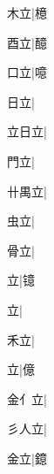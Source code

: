 \begin{multicols}{2}
{{\cjk{}{\cnsym{}　}木立}|{\cjk{}檍}\par
{\cjk{}{\cnsym{}　}酉立}|{\cjk{}醷}\par
{\cjk{}{\cnsym{}　}口立}|{\cjk{}噫}\par
{\cjk{}{\cnsym{}　}日立}|{}\par
{\cjk{}立日立}|{}\par
{\cjk{}{\cnsym{}　}門立}|{}\par
{\cjk{}卄禺立}|{}\par
{\cjk{}{\cnsym{}　}虫立}|{}\par
{\cjk{}{\cnsym{}　}骨立}|{}\par
{立}|{\cjk{}镱}\par
{立}|{}\par
{\cjk{}{\cnsym{}　}禾立}|{}\par
{立}|{\cjk{}億}\par
{\cjk{}金{亻}立}|{}\par
{\cjk{}彡人立}|{}\par
{\cjk{}{\cnsym{}　}金立}|{\cjk{}鐿}\par
}
\end{multicols}
